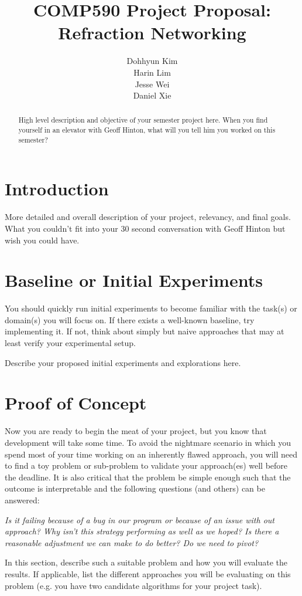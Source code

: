\documentclass{article} %
\title{COMP590 Project Proposal: Refraction Networking}
\author{
Dohhyun Kim \\
\AND
Harin Lim \\
\AND
Jesse Wei \\
\AND
Daniel Xie \\
}
\begin{document}
\maketitle

\begin{abstract}
High level description and objective of your semester project here. When you find yourself in an elevator with Geoff Hinton, what will you tell him you worked on this semester?
\end{abstract}

\section{Introduction}
More detailed and overall description of your project, relevancy, and final goals. What you couldn't fit into your 30 second conversation with Geoff Hinton but wish you could have.

\section{Baseline or Initial Experiments}
You should quickly run initial experiments to become familiar with the task(s) or domain(s) you will focus on. If there exists a well-known baseline, try implementing it. If not, think about simply but naive approaches that may at least verify your experimental setup. 

Describe your proposed initial experiments and explorations here.

\section{Proof of Concept}
Now you are ready to begin the meat of your project, but you know that development will take some time. To avoid the nightmare scenario in which you spend most of your time working on an inherently flawed approach, you will need to find a toy problem or sub-problem to validate your approach(es) well before the deadline. It is also critical that the problem be simple enough such that the outcome is interpretable and the following questions (and others) can be answered:

\textit{Is it failing because of a bug in our program or because of an issue with out approach? Why isn't this strategy performing as well as we hoped? Is there a reasonable adjustment we can make to do better? Do we need to pivot?}

In this section, describe such a suitable problem and how you will evaluate the results. If applicable, list the different approaches you will be evaluating on this problem (e.g. you have two candidate algorithms for your project task).
\end{document}
